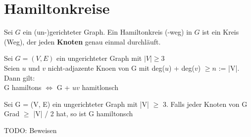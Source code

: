 \documentclass[14pt]{article}
\begin{document}
    \section{Hamiltonkreise}
    \begin{definition}
        Sei $G$ ein (un-)gerichteter Graph. Ein Hamiltonkreis (-weg)
        in $G$ ist ein Kreis (Weg), der jeden \textbf{Knoten} genau
        einmal durchläuft.
    \end{definition}
    \begin{eigenschaft}
        Sei $G = (V, E)$ ein ungerichteter Graph mit $|V| \geq 3$ \\
        Seien $u$ und $v$ nicht-adjazente Knoen von G mit deg($u$)
        + deg($v$) $\geq n$ := |V|. Dann gilt: \\
        \indent G hamiltons $\Leftrightarrow$ G + $uv$ hamitlonsch 
    \end{eigenschaft}
    \begin{eigenschaft}
        Sei G = (V, E) ein ungerichteter Graph mit |V| $\geq$ 3.
        Falls jeder Knoten von G Grad $\geq$ |V| / 2 hat, so ist 
        G hamiltonsch
    \end{eigenschaft}
    TODO: Beweisen
\end{document}
